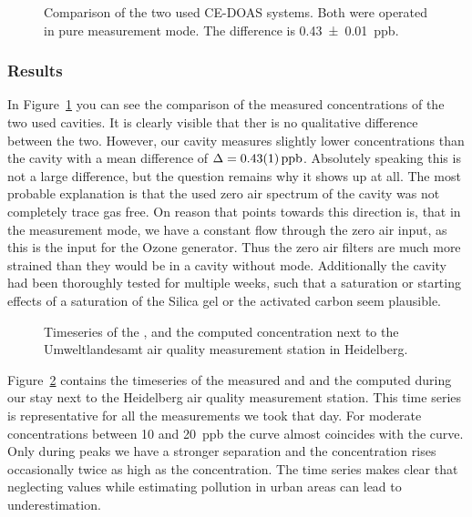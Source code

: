 \begin{figure}[htbp]
  \centering
  
  \caption{Comparison of the two used CE-DOAS systems. Both were
    operated in pure  measurement mode. The difference is
    \SI{0.43 \pm 0.01}{ppb}.}
  \label{fig:hd-comparison}
\end{figure}

\subsubsection{Results}
\label{sec:vehicle-results}

In Figure~\ref{fig:hd-comparison} you can see the comparison of the
measured  concentrations of the two used cavities. It is
clearly visible that ther is no qualitative difference between the
two. However, our  cavity measures slightly lower
concentrations than the  cavity with a mean difference of
$\Delta = \SI{0.43\pm0.01}{ppb}$. Absolutely speaking this is not a
large difference, but the question remains why it shows up at all. The
most probable explanation is that the used zero air spectrum of the
 cavity was not completely trace gas free. On reason that
points towards this direction is, that in the  measurement
mode, we have a constant flow through the zero air input, as this is
the input for the Ozone generator. Thus the zero air filters are much
more strained than they would be in a cavity without 
mode. Additionally the cavity had been thoroughly tested for multiple
weeks, such that a saturation or starting effects of a saturation of
the Silica gel or the activated carbon seem plausible. 

\begin{figure}[htbp]
  \centering
  
  \caption{Timeseries of the ,  and the computed
     concentration next to the Umweltlandesamt air quality
    measurement station in Heidelberg.}
  \label{fig:umba}
\end{figure}

Figure~\ref{fig:umba} contains the timeseries of the measured
 and  and the computed  during our stay next
to the Heidelberg air quality measurement station. This time series is
representative for all the measurements we took that day. For moderate
 concentrations between \num{10} and \SI{20}{ppb} the
 curve almost coincides with the  curve. Only during
peaks we have a stronger separation and the  concentration
rises occasionally twice as high as the  concentration. The
time series makes clear that neglecting  values while
estimating  pollution in urban areas can lead to
underestimation.

